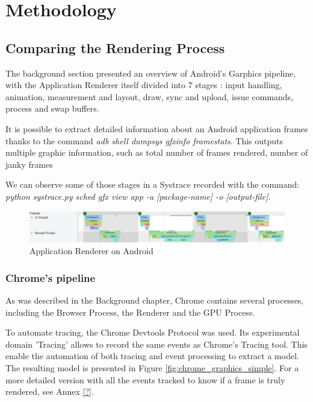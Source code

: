 \chapter{Methodology}
\section{Comparing the Rendering Process}
   
    The background section presented an overview of Android's Garphics pipeline, with the Application Renderer itself divided into 7 stages : input handling, animation, measurement and layout, draw, sync and upload, issue commands, process and swap buffers. 
    
    It is possible to extract detailed information about an Android application frames thanks to the command \textit{adb shell dumpsys gfxinfo framestats}. This outputs multiple graphic information, such as total number of frames rendered, number of janky frames
    
    We can observe some of those stages in a Systrace recorded with the command: \textit{python systrace.py sched gfx view app -a [package-name] -o [output-file]}.
    
    \begin{figure}[!ht]
        \includegraphics[width=15cm]{kththesis/Figures/android_systrace_frame.jpg}
        \caption{Application Renderer on Android}
        \label{fig:android_systrace}
    \end{figure}
    
    
    \subsection{Chrome's pipeline}
       As was described in the Background chapter, Chrome contains several processes, including the Browser Process, the Renderer and the GPU Process.
       
       To automate tracing, the Chrome Devtools Protocol was used. Its experimental domain 'Tracing' allows to record the same events as Chrome's Tracing tool. This enable the automation of both tracing and event processing to extract a model. \newline
The resulting model is presented in Figure \ref{fig:chrome_graphics_simple}. For a more detailed version with all the events tracked to know if a frame is truly rendered, see Annex \ref{?}.

